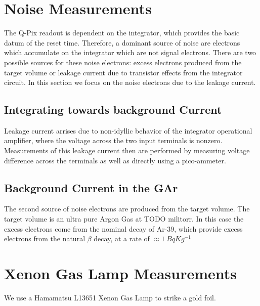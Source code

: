 \section{Noise Measurements}

The Q-Pix readout is dependent on the integrator, which provides the basic datum of the reset time.
Therefore, a dominant source of noise are electrons which accumulate on the integrator which are not signal electrons.
There are two possible sources for these noise electrons: excess electrons produced from the target volume or leakage current due to transistor effects from the integrator circuit.
In this section we focus on the noise electrons due to the leakage current.

\subsection{Integrating towards background Current}

Leakage current arrises due to non-idyllic behavior of the integrator operational amplifier, where the voltage across the two input terminals is nonzero.
Measurements of this leakage current then are performed by measuring voltage difference across the terminals as well as directly using a pico-ammeter.

\subsection{Background Current in the GAr}

The second source of noise electrons are produced from the target volume.
The target volume is an ultra pure Argon Gas at TODO militorr.
In this case the excess electrons come from the nominal decay of Ar-39, which provide excess electrons from the natural $\beta$ decay, at a rate of $\approx 1~\unit{Bq}{Kg^{-1}}$


\section{Xenon Gas Lamp Measurements}

We use a Hamamatsu L13651 Xenon Gas Lamp to strike a gold foil.

